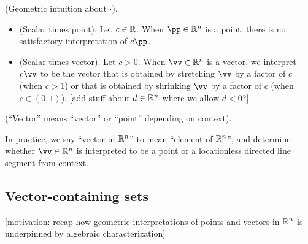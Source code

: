 \begin{remark}
    (Geometric intuition about $\cdot$).
    \begin{itemize}
        \item (Scalar times point). Let $c \in \mathbb{R}$. When $\pp \in \R^n$ is a point, there is no satisfactory interpretation of $c \pp$.
        \item (Scalar times vector). Let $c > 0$. When $\vv \in \R^n$ is a vector, we interpret $c \vv$ to be the vector that is obtained by stretching $\vv$ by a factor of $c$ (when $c > 1$) or that is obtained by shrinking $\vv$ by a factor of $c$ (when $c \in (0, 1)$). [add stuff about $d \in \mathbb{R}^n$ where we allow $d < 0$?]
    \end{itemize}
\end{remark}

\begin{defn}
    (``Vector'' means ``vector'' or ``point'' depending on context).
    
    In practice, we say ``vector in $\mathbb{R}^n$'' to mean ``element of $\mathbb{R}^n$'', and determine whether $\vv \in \R^n$ is interpreted to be a point or a locationless directed line segment from context.
\end{defn}

\newpage

\subsection*{Vector-containing sets}

[motivation: recap how geometric interpretations of points and vectors in $\mathbb{R}^n$ is underpinned by algebraic characterization]

